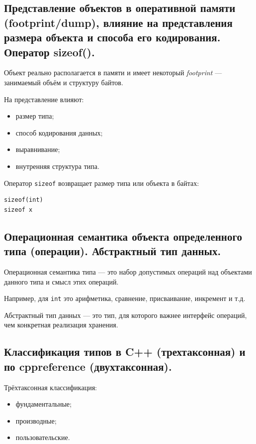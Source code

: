 \subsection{Представление объектов в оперативной памяти (footprint/dump), влияние на представления размера объекта и способа его кодирования. Оператор sizeof().}

Объект реально располагается в памяти и имеет некоторый \textit{footprint} --- занимаемый объём и структуру байтов.

На представление влияют:
\begin{itemize}
    \item размер типа;
    \item способ кодирования данных;
    \item выравнивание;
    \item внутренняя структура типа.
\end{itemize}

Оператор \texttt{sizeof} возвращает размер типа или объекта в байтах:
\begin{verbatim}
sizeof(int)
sizeof x
\end{verbatim}


\subsection{Операционная семантика объекта определенного типа (операции). Абстрактный тип данных.}

Операционная семантика типа --- это набор допустимых операций над объектами данного типа и смысл этих операций.

Например, для \texttt{int} это арифметика, сравнение, присваивание, инкремент и т.д.

Абстрактный тип данных --- это тип, для которого важнее интерфейс операций, чем конкретная реализация хранения.


\subsection{Классификация типов в C++ (трехтаксонная) и по cppreference (двухтаксонная).}

Трёхтаксонная классификация:
\begin{itemize}
    \item фундаментальные;
    \item производные;
    \item пользовательские.
\end{itemize}

